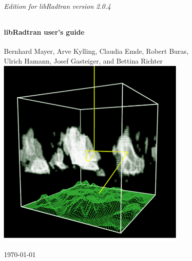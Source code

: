 \begin{titlepage}
 
\begin{center}
 
  \begin{flushright}
    {\sl \large Edition for libRadtran version 2.0.4}
  \end{flushright}
  \vspace*{2cm}
  
  \HRule \\[0.8cm]
  { \huge \bfseries libRadtran user's guide}\\[0.4cm]
  \HRule \\[1.5cm]
  
  \Large{Bernhard Mayer, Arve Kylling, Claudia Emde, Robert Buras, \\
    Ulrich Hamann, Josef Gasteiger, and Bettina Richter} \\[2cm]
  
  \includegraphics[width=0.7\textwidth]{figs/mystic2.png}\\

  \vfill
  
  {\large \today}
  
\end{center}

\end{titlepage}
